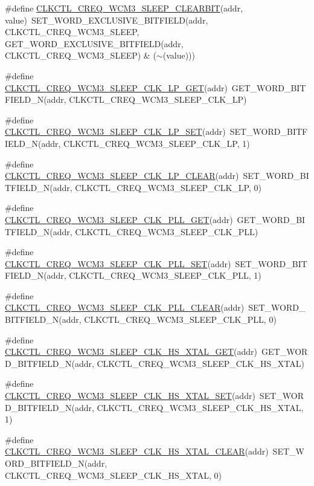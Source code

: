 \begin{DoxyCompactItemize}
\item 
\#define \hyperlink{a00544_ab16e896016bb4a8be7367b534e0a46ac}{CLKCTL\_\-CREQ\_\-WCM3\_\-SLEEP\_\-CLEARBIT}(addr, value)~SET\_\-WORD\_\-EXCLUSIVE\_\-BITFIELD(addr, CLKCTL\_\-CREQ\_\-WCM3\_\-SLEEP, GET\_\-WORD\_\-EXCLUSIVE\_\-BITFIELD(addr, CLKCTL\_\-CREQ\_\-WCM3\_\-SLEEP) \& ($\sim$(value)))
\item 
\#define \hyperlink{a00544_aba3f46d6d7dd375b2dba1ecc79166285}{CLKCTL\_\-CREQ\_\-WCM3\_\-SLEEP\_\-CLK\_\-LP\_\-GET}(addr)~GET\_\-WORD\_\-BITFIELD\_\-N(addr, CLKCTL\_\-CREQ\_\-WCM3\_\-SLEEP\_\-CLK\_\-LP)
\item 
\#define \hyperlink{a00544_afc58fda197bf0726c699bb9af6f539e5}{CLKCTL\_\-CREQ\_\-WCM3\_\-SLEEP\_\-CLK\_\-LP\_\-SET}(addr)~SET\_\-WORD\_\-BITFIELD\_\-N(addr, CLKCTL\_\-CREQ\_\-WCM3\_\-SLEEP\_\-CLK\_\-LP, 1)
\item 
\#define \hyperlink{a00544_a0cdd7e81437e26f643f6b3570c57b60b}{CLKCTL\_\-CREQ\_\-WCM3\_\-SLEEP\_\-CLK\_\-LP\_\-CLEAR}(addr)~SET\_\-WORD\_\-BITFIELD\_\-N(addr, CLKCTL\_\-CREQ\_\-WCM3\_\-SLEEP\_\-CLK\_\-LP, 0)
\item 
\#define \hyperlink{a00544_a5135859cbbd08b835c87d5d93345d3c3}{CLKCTL\_\-CREQ\_\-WCM3\_\-SLEEP\_\-CLK\_\-PLL\_\-GET}(addr)~GET\_\-WORD\_\-BITFIELD\_\-N(addr, CLKCTL\_\-CREQ\_\-WCM3\_\-SLEEP\_\-CLK\_\-PLL)
\item 
\#define \hyperlink{a00544_aae7f643f1b6e59511ed62318027528dd}{CLKCTL\_\-CREQ\_\-WCM3\_\-SLEEP\_\-CLK\_\-PLL\_\-SET}(addr)~SET\_\-WORD\_\-BITFIELD\_\-N(addr, CLKCTL\_\-CREQ\_\-WCM3\_\-SLEEP\_\-CLK\_\-PLL, 1)
\item 
\#define \hyperlink{a00544_a10377ba3e1089ebd2ef594c1906bca70}{CLKCTL\_\-CREQ\_\-WCM3\_\-SLEEP\_\-CLK\_\-PLL\_\-CLEAR}(addr)~SET\_\-WORD\_\-BITFIELD\_\-N(addr, CLKCTL\_\-CREQ\_\-WCM3\_\-SLEEP\_\-CLK\_\-PLL, 0)
\item 
\#define \hyperlink{a00544_ab628e50c555445ef9680c885668f48d3}{CLKCTL\_\-CREQ\_\-WCM3\_\-SLEEP\_\-CLK\_\-HS\_\-XTAL\_\-GET}(addr)~GET\_\-WORD\_\-BITFIELD\_\-N(addr, CLKCTL\_\-CREQ\_\-WCM3\_\-SLEEP\_\-CLK\_\-HS\_\-XTAL)
\item 
\#define \hyperlink{a00544_af2b3f1c78dd4b66b03d5b22693da8cda}{CLKCTL\_\-CREQ\_\-WCM3\_\-SLEEP\_\-CLK\_\-HS\_\-XTAL\_\-SET}(addr)~SET\_\-WORD\_\-BITFIELD\_\-N(addr, CLKCTL\_\-CREQ\_\-WCM3\_\-SLEEP\_\-CLK\_\-HS\_\-XTAL, 1)
\item 
\#define \hyperlink{a00544_a91047219fedc03dd73c39973f8094069}{CLKCTL\_\-CREQ\_\-WCM3\_\-SLEEP\_\-CLK\_\-HS\_\-XTAL\_\-CLEAR}(addr)~SET\_\-WORD\_\-BITFIELD\_\-N(addr, CLKCTL\_\-CREQ\_\-WCM3\_\-SLEEP\_\-CLK\_\-HS\_\-XTAL, 0)

\end{DoxyCompactItemize}
